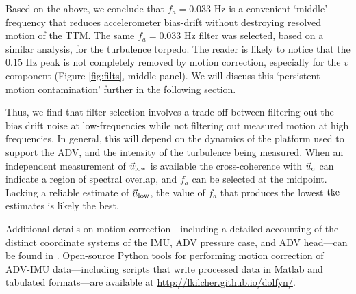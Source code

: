 Based on the above, we conclude that $f_a = 0.033$ Hz is a convenient `middle' frequency that reduces accelerometer bias-drift without destroying resolved motion of the TTM.  The same $f_a=0.033$ Hz filter was selected, based on a similar analysis, for the turbulence torpedo. The reader is likely to notice that the $0.15$ Hz peak is not completely removed by motion correction, especially for the $v$ component (Figure \ref{fig:filts}, middle panel). We will discuss this `persistent motion contamination' further in the following section.

Thus, we find that filter selection involves a trade-off between filtering out the bias drift noise at low-frequencies while not filtering out measured motion at high frequencies. In general, this will depend on the dynamics of the platform used to support the ADV, and the intensity of the turbulence being measured. When an independent measurement of $\ulow$ is available the cross-coherence with $\uacc$ can indicate a region of spectral overlap, and $f_a$ can be selected at the midpoint. Lacking a reliable estimate of $\ulow$,  the value of $f_a$ that produces the lowest $\mathrm{tke}$ estimates is likely the best. 

Additional details on motion correction---including a detailed accounting of the distinct coordinate systems of the IMU, ADV pressure case, and ADV head---can be found in \cite{Kilcher++2016}. Open-source Python tools for performing motion correction of ADV-IMU data---including scripts that write processed data in Matlab and tabulated formats---are available at \url{http://lkilcher.github.io/dolfyn/}.

\def\ue{\ensuremath{\vec{u}\earth}}

